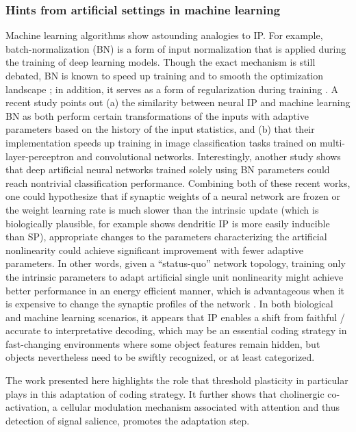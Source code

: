 \subsubsection*{Hints from artificial settings in machine learning}

Machine learning algorithms show astounding analogies to IP.
    For example, batch-normalization (BN) is a form of input normalization
        that is applied during the training of deep learning models.
    Though the exact mechanism is still debated, BN is known to speed up training
            and to smooth the optimization landscape \citep{Ioffe2015-bw,Santurkar2018-ff};
        in addition, it serves as a form of regularization during training \citep{Luo2018-vw}.
    A recent study \citep{Shaw2020-hu} points out
        (a) the similarity between neural IP and machine learning BN
            as both perform certain transformations of the inputs
            with adaptive parameters based on the history of the input statistics,
        and (b) that their implementation speeds up training
            in image classification tasks
            trained on multi-layer-perceptron and convolutional networks.
    Interestingly, another study \citep{Frankle2020-qs} shows that
        deep artificial neural networks trained solely using BN parameters
        could reach nontrivial classification performance.
    Combining both of these recent works, one could hypothesize that
        if synaptic weights of a neural network are frozen
            or the weight learning rate is much slower than the intrinsic update
            (which is biologically plausible, for example
                \cite{Lopez-Rojas2016-ew} shows dendritic IP is more easily inducible than SP),
        appropriate changes to the parameters characterizing the artificial nonlinearity
            could achieve significant improvement with fewer adaptive parameters.
    In other words, given a ``status-quo'' network topology,
        training only the intrinsic parameters to adapt artificial single unit nonlinearity
        might achieve better performance in an energy efficient manner,
            which is advantageous when it is expensive to change the synaptic profiles of the network \citep{Gallistel2017-em}.
    In both biological and machine learning scenarios, it appears that
        IP enables a shift from faithful / accurate to interpretative decoding,
            which may be an essential coding strategy in fast-changing environments
                where some object features remain hidden,
        but objects nevertheless need to be swiftly recognized, or at least categorized.

The work presented here highlights the role that
        threshold plasticity in particular plays in this adaptation of coding strategy.
    It further shows that cholinergic co-activation,
        a cellular modulation mechanism associated with attention
        and thus detection of signal salience,
    promotes the adaptation step.
